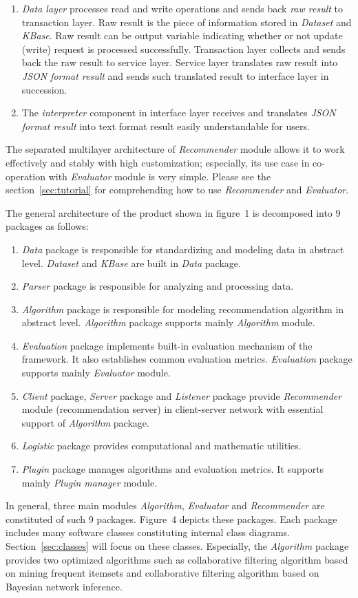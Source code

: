 \documentclass[a4paper]{llncs}
\begin{document}
\begin{enumerate}
\item \textit{Data layer} processes read and write operations and sends back \textit{raw result} to transaction layer. Raw result is the piece of information stored in \textit{Dataset} and \textit{KBase}. Raw result can be output variable indicating whether or not update (write) request is processed successfully. Transaction layer collects and sends back the raw result to service layer. Service layer translates raw result into \textit{JSON format result} and sends such translated result to interface layer in succession.
\item The \textit{interpreter} component in interface layer receives and translates \textit{JSON format result} into text format result easily understandable for users.
\end{enumerate}
The separated multilayer architecture of \textit{Recommender} module allows it to work effectively and stably with high customization; especially, its use case in co-operation with \textit{Evaluator} module is very simple. Please see the section~\ref{sec:tutorial} for comprehending how to use \textit{Recommender} and \textit{Evaluator}.

The general architecture of the product shown in figure~1 is decomposed into 9 packages as follows:
\begin{enumerate}
\item \textit{Data} package is responsible for standardizing and modeling data in abstract level. \textit{Dataset} and \textit{KBase} are built in \textit{Data} package.
\item \textit{Parser} package is responsible for analyzing and processing data.
\item \textit{Algorithm} package is responsible for modeling recommendation algorithm in abstract level. \textit{Algorithm} package supports mainly \textit{Algorithm} module.
\item \textit{Evaluation} package implements built-in evaluation mechanism of the framework. It also establishes common evaluation metrics. \textit{Evaluation} package supports mainly \textit{Evaluator} module.
\item \textit{Client} package, \textit{Server} package and \textit{Listener} package provide \textit{Recommender} module (recommendation server) in client-server network with essential support of \textit{Algorithm} package.
\item \textit{Logistic} package provides computational and mathematic utilities.
\item \textit{Plugin} package manages algorithms and evaluation metrics. It supports mainly \textit{Plugin manager} module.
\end{enumerate}
In general, three main modules \textit{Algorithm}, \textit{Evaluator} and \textit{Recommender} are constituted of such 9 packages. Figure~4 depicts these packages. Each package includes many software classes constituting internal class diagrams. Section~\ref{sec:classes} will focus on these classes. Especially, the \textit{Algorithm} package provides two optimized algorithms such as collaborative filtering algorithm based on mining frequent itemsets and collaborative filtering algorithm based on Bayesian network inference.
\end{document}

